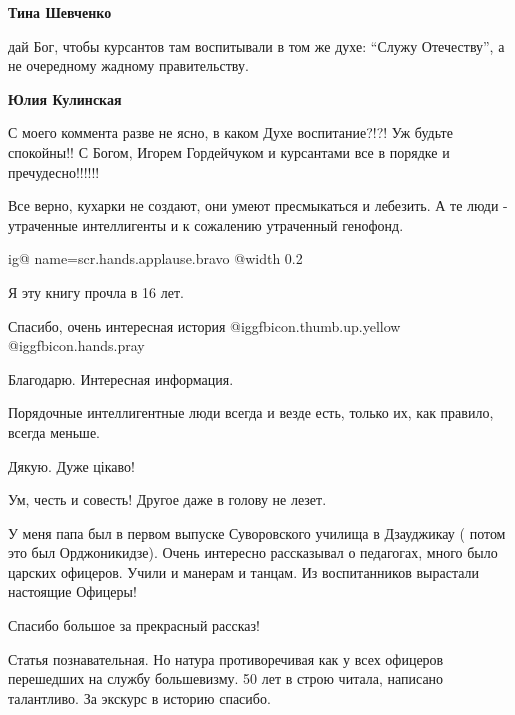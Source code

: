 \begin{itemize}
\begin{itemize}
\textbf{Тина Шевченко} 

дай Бог, чтобы курсантов там воспитывали в том же духе: \enquote{Служу Отечеству}, а не
очередному жадному правительству.

\begin{itemize} %
\textbf{Юлия Кулинская} 

С моего коммента разве не ясно, в каком Духе воспитание?!?! Уж будьте спокойны!!
С Богом, Игорем Гордейчуком и курсантами все в порядке и пречудесно!!!!!!

\end{itemize} %

\end{itemize} %


Все верно, кухарки не создают, они умеют пресмыкаться и лебезить. А те
люди - утраченные интеллигенты и к сожалению утраченный генофонд.



\ifcmt
  ig@ name=scr.hands.applause.bravo
  @width 0.2
\fi

Я эту книгу прочла в 16 лет.

Спасибо, очень интересная история  @igg{fbicon.thumb.up.yellow}  @igg{fbicon.hands.pray} 

Благодарю. Интересная информация.

Порядочные интеллигентные люди всегда и везде есть, только их, как правило, всегда меньше.

Дякую. Дуже цікаво!

Ум, честь и совесть! Другое даже в голову не лезет.


У меня папа был в первом выпуске Суворовского училища в Дзауджикау ( потом это
был Орджоникидзе). Очень интересно рассказывал о педагогах, много было
царских офицеров. Учили и манерам и танцам. Из воспитанников вырастали
настоящие Офицеры!


Спасибо большое за прекрасный рассказ!


Статья познавательная. Но натура противоречивая как у всех офицеров перешедших
на службу большевизму. 50 лет в строю читала, написано талантливо. За экскурс в
историю спасибо.


\end{itemize}
